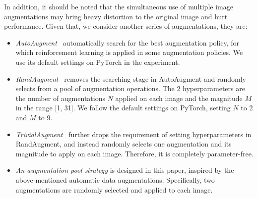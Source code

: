 \documentclass[letterpaper]{article} %
\begin{document}
In addition, it should be noted that the simultaneous use of multiple image augmentations may bring heavy distortion to the original image and hurt performance.
Given that, we consider another series of augmentations, they are:
\begin{itemize}
    \item \textit{AutoAugment~\cite{cubuk2018autoaugment}} automatically search for the best augmentation policy, for which reinforcement learning is applied in some augmentation policies. We use its default settings on PyTorch in the experiment.
    
    \item \textit{RandAugment~\cite{cubuk2020randaugment}} removes the searching stage in AutoAugment and randomly selects from a pool of augmentation operations. The 2 hyperparameters are the number of augmentations $N$ applied on each image and the magnitude $M$ in the range [1, 31]. We follow the default settings on PyTorch, setting $N$ to 2 and $M$ to 9.
    \item \textit{TrivialAugment~\cite{muller2021trivialaugment}} further drops the requirement of setting hyperparameters in RandAugment, and instead randomly selects one augmentation and its magnitude to apply on each image. Therefore, it is completely parameter-free.
    \item
    \textit{An augmentation pool strategy} is designed in this paper, inspired by the above-mentioned automatic data augmentations. Specifically, two augmentations are randomly selected and applied to each image.
\end{itemize}


\end{document}
